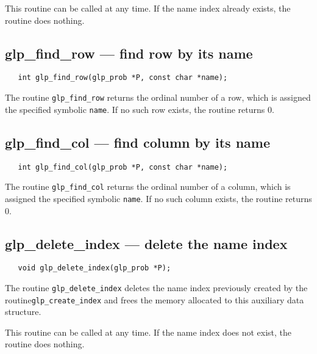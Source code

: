This routine can be called at any time. If the name index already
exists, the routine does nothing.

\newpage

\subsection{glp\_find\_row --- find row by its name}

\synopsis

\begin{verbatim}
   int glp_find_row(glp_prob *P, const char *name);
\end{verbatim}

\returns

The routine \verb|glp_find_row| returns the ordinal number of a row,
which is assigned the specified symbolic \verb|name|. If no such row
exists, the routine returns 0.

\subsection{glp\_find\_col --- find column by its name}

\synopsis

\begin{verbatim}
   int glp_find_col(glp_prob *P, const char *name);
\end{verbatim}

\returns

The routine \verb|glp_find_col| returns the ordinal number of a column,
which is assigned the specified symbolic \verb|name|. If no such column
exists, the routine returns 0.

\subsection{glp\_delete\_index --- delete the name index}

\synopsis

\begin{verbatim}
   void glp_delete_index(glp_prob *P);
\end{verbatim}

\description

The routine \verb|glp_delete_index| deletes the name index previously
created by the routine\linebreak \verb|glp_create_index| and frees the
memory allocated to this auxiliary data structure.

This routine can be called at any time. If the name index does not
exist, the routine does nothing.

